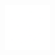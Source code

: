 \documentclass[
        a4paper, %
	8pt, %
]{CSSullivanBusinessReport}
\begin{document}
\pagecolor{bg}
\color{white}


\thispagestyle{empty} %

\begin{fullwidth} %
	\vspace*{-0.075\textheight} %

	\hfill\includegraphics[width=2cm]{Images/xenophon_inv.png} %
 
	\vspace{0.1\textheight} %

	\parbox{0.9\fulltextwidth}{\fontsize{40pt}{42pt}\selectfont\raggedright\reporttitle\par} %
	
	\vspace{0.03\textheight} %
	
	{\LARGE{\reportsubtitle}\par} %
	
	\vspace*{4in}%
	
	{\Large\reportauthors\par} %
	{\large\reportdate\par} %
\end{fullwidth}

\newpage


\thispagestyle{empty} %
\end{document}

